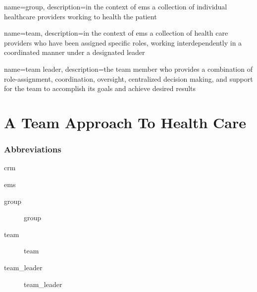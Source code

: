 \documentclass[../../EMT-169.tex]{subfiles}
\begin{document}
\setcounter{chapter}{40}
\label{ch:chapter41}
\clearpage
	
	


	{
		name=group,
		description={in the context of \acrshort{ems} a collection of individual healthcare providers working to health the patient}
	}
	
	{
		name=team,
		description={in the context of \acrshort{ems} a collection of health care providers who have been assigned specific roles, working interdependently in a coordinated manner under a designated leader}
	}

	{
		name=team leader,
		description={the team member who provides a combination of role-assignment, coordination, oversight, centralized decision making, and support for the team to accomplish its goals and achieve desired results}
	}
		
\chapter{A Team Approach To Health Care}

\subsection*{Abbreviations}
\begin{description}[leftmargin=!,labelwidth=\widthof{\bfseries ABCD}]
	\item [\acrshort{crm}] \acrlong{crm}
\end{description}

ems
\begin{description}	
	\item [\gls{group}] \glsdesc{group}
	\item [\gls{team}] \glsdesc{team}
	\item [\gls{team_leader}] \glsdesc{team_leader}
\end{description}\hfill \\

\end{document}
